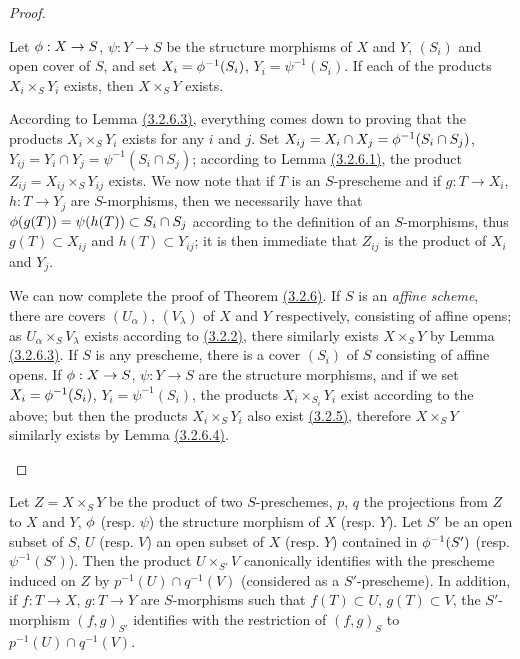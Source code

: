 \begin{proof}
\begin{lem}[3.2.6.4]
\label{lem-1.3.2.6.4}
Let $\phi:X\to S$, $\psi:Y\to S$ be the structure morphisms of $X$ and $Y$, $(S_i)$ and open
cover of $S$, and set $X_i=\phi^{-1}(S_i)$, $Y_i=\psi^{-1}(S_i)$. If each of the products
$X_i\times_S Y_i$ exists, then $X\times_S Y$ exists.
\end{lem}

According to Lemma \hyperref[lem-1.3.2.6.3]{(3.2.6.3)}, everything comes down to proving that the products
$X_i\times_S Y_i$ exists for any $i$ and $j$. Set
$X_{ij}=X_i\cap X_j=\phi^{-1}(S_i\cap S_j)$, $Y_{ij}=Y_i\cap Y_j=\psi^{-1}(S_i\cap S_j)$;
according to Lemma \hyperref[lem-1.3.2.6.1]{(3.2.6.1)}, the product $Z_{ij}=X_{ij}\times_S Y_{ij}$ exists. We now
note that if $T$ is an $S$-prescheme and if $g:T\to X_i$, $h:T\to Y_j$ are $S$-morphisms,
then we necessarily have that $\phi(g(T))=\psi(h(T))\subset S_i\cap S_j$ according to the
definition of an $S$-morphisms, thus $g(T)\subset X_{ij}$ and $h(T)\subset Y_{ij}$; it is
then immediate that $Z_{ij}$ is the product of $X_i$ and $Y_j$.

\begin{env}[3.2.6.5]
\label{env-1.3.2.6.5}
We can now complete the proof of Theorem \hyperref[thm-1.3.2.6]{(3.2.6)}. If $S$ is an {\it affine
scheme}, there are covers $(U_\alpha)$, $(V_\lambda)$ of $X$ and $Y$ respectively,
consisting of affine opens; as $U_\alpha\times_S V_\lambda$ exists according to
\hyperref[prop-1.3.2.2]{(3.2.2)}, there similarly exists $X\times_S Y$ by Lemma \hyperref[lem-1.3.2.6.3]{(3.2.6.3)}. If $S$
is any prescheme, there is a cover $(S_i)$ of $S$ consisting of affine opens. If
$\phi:X\to S$, $\psi:Y\to S$ are the structure morphisms, and if we set
$X_i=\phi^{-1}(S_i)$, $Y_i=\psi^{-1}(S_i)$, the products $X_i\times_{S_i}Y_i$ exist
according to the
above; but then the products $X_i\times_S Y_i$ also exist \hyperref[cor-1.3.2.5]{(3.2.5)}, therefore
$X\times_S Y$ similarly exists by Lemma \hyperref[lem-1.3.2.6.4]{(3.2.6.4)}.
\end{env}
\end{proof}

\begin{cor}[3.2.7]
\label{cor-1.3.2.7}
Let $Z=X\times_S Y$ be the product of two $S$-preschemes, $p$, $q$ the projections from $Z$
to $X$ and $Y$, $\phi$ (resp. $\psi$) the structure morphism of $X$ (resp. $Y$). Let $S'$ be
an open subset of $S$, $U$ (resp. $V$) an open subset of $X$ (resp. $Y$) contained in
$\phi^{-1}(S')$ (resp. $\psi^{-1}(S')$). Then the product $U\times_{S'}V$ canonically
identifies with the prescheme induced on $Z$ by $p^{-1}(U)\cap q^{-1}(V)$ (considered as a
$S'$-prescheme). In addition, if $f:T\to X$, $g:T\to Y$ are $S$-morphisms such that
$f(T)\subset U$, $g(T)\subset V$, the $S'$-morphism $(f,g)_{S'}$ identifies with the
restriction of $(f,g)_S$ to $p^{-1}(U)\cap q^{-1}(V)$.
\end{cor}

